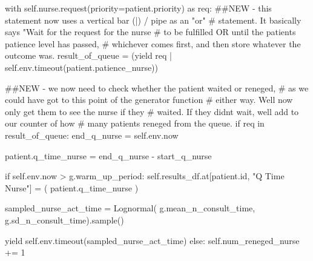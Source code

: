 \documentclass[
  letterpaper,
  DIV=11,
  numbers=noendperiod]{scrreprt}
\newenvironment{Shaded}{\begin{snugshade}}{\end{snugshade}}
\newcommand{\BuiltInTok}[1]{\textcolor[rgb]{0.00,0.23,0.31}{#1}}
\newcommand{\CommentTok}[1]{\textcolor[rgb]{0.37,0.37,0.37}{#1}}
\newcommand{\ControlFlowTok}[1]{\textcolor[rgb]{0.00,0.23,0.31}{#1}}
\newcommand{\DecValTok}[1]{\textcolor[rgb]{0.68,0.00,0.00}{#1}}
\newcommand{\ImportTok}[1]{\textcolor[rgb]{0.00,0.46,0.62}{#1}}
\newcommand{\KeywordTok}[1]{\textcolor[rgb]{0.00,0.23,0.31}{#1}}
\newcommand{\NormalTok}[1]{\textcolor[rgb]{0.00,0.23,0.31}{#1}}
\newcommand{\OperatorTok}[1]{\textcolor[rgb]{0.37,0.37,0.37}{#1}}
\newcommand{\StringTok}[1]{\textcolor[rgb]{0.13,0.47,0.30}{#1}}
\newcommand{\VariableTok}[1]{\textcolor[rgb]{0.07,0.07,0.07}{#1}}
\begin{document}
\begin{tcolorbox}
\begin{Shaded}
\begin{Highlighting}[]
        \ControlFlowTok{with} \VariableTok{self}\NormalTok{.nurse.request(priority}\OperatorTok{=}\NormalTok{patient.priority) }\ImportTok{as}\NormalTok{ req:}
            \CommentTok{\#\#NEW {-} this statement now uses a vertical bar (|) / pipe as an "or"}
            \CommentTok{\# statement.  It basically says "Wait for the request for the nurse}
            \CommentTok{\# to be fulfilled OR until the patient\textquotesingle{}s patience level has passed,}
            \CommentTok{\# whichever comes first, and then store whatever the outcome was.}
\NormalTok{            result\_of\_queue }\OperatorTok{=}\NormalTok{ (}\ControlFlowTok{yield}\NormalTok{ req }\OperatorTok{|}
                               \VariableTok{self}\NormalTok{.env.timeout(patient.patience\_nurse))}

            \CommentTok{\#\#NEW {-} we now need to check whether the patient waited or reneged,}
            \CommentTok{\# as we could have got to this point of the generator function}
            \CommentTok{\# either way.  We\textquotesingle{}ll now only get them to see the nurse if they}
            \CommentTok{\# waited.  If they didn\textquotesingle{}t wait, we\textquotesingle{}ll add to our counter of how}
            \CommentTok{\# many patients reneged from the queue.}
            \ControlFlowTok{if}\NormalTok{ req }\KeywordTok{in}\NormalTok{ result\_of\_queue:}
\NormalTok{                end\_q\_nurse }\OperatorTok{=} \VariableTok{self}\NormalTok{.env.now}

\NormalTok{                patient.q\_time\_nurse }\OperatorTok{=}\NormalTok{ end\_q\_nurse }\OperatorTok{{-}}\NormalTok{ start\_q\_nurse}

                \ControlFlowTok{if} \VariableTok{self}\NormalTok{.env.now }\OperatorTok{\textgreater{}}\NormalTok{ g.warm\_up\_period:}
                    \VariableTok{self}\NormalTok{.results\_df.at[patient.}\BuiltInTok{id}\NormalTok{, }\StringTok{"Q Time Nurse"}\NormalTok{] }\OperatorTok{=}\NormalTok{ (}
\NormalTok{                        patient.q\_time\_nurse}
\NormalTok{                    )}

\NormalTok{                sampled\_nurse\_act\_time }\OperatorTok{=}\NormalTok{ Lognormal(}
\NormalTok{                    g.mean\_n\_consult\_time, g.sd\_n\_consult\_time).sample()}

                \ControlFlowTok{yield} \VariableTok{self}\NormalTok{.env.timeout(sampled\_nurse\_act\_time)}
            \ControlFlowTok{else}\NormalTok{:}
                \VariableTok{self}\NormalTok{.num\_reneged\_nurse }\OperatorTok{+=} \DecValTok{1}


\end{Highlighting}
\end{Shaded}
\end{tcolorbox}
\end{document}
